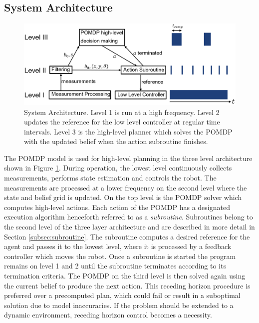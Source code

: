 \subsection{System Architecture}\label{subsec:sysarch}
\begin{figure}
    \centering
    \includegraphics[width=1.0\textwidth]{Report/images/3LevelArchitecture_bothb.png}
    \caption{System Architecture. Level 1 is run at a high frequency. Level 2 updates the reference for the low level controller at regular time intervals. Level 3 is the high-level planner which solves the POMDP with the updated belief when the action subroutine finishes. }
    \label{fig:3levelsarchitecture}
\end{figure}
%
The POMDP model is used for high-level planning in the three level architecture shown in Figure \ref{fig:3levelsarchitecture}. During operation, the lowest level continuously collects measurements, performs state estimation and controls the robot. The measurements are processed at a lower frequency on the second level where the state and belief grid is updated. On the top level is the POMDP solver which computes high-level actions. Each action of the POMDP has a designated execution algorithm henceforth referred to as a \emph{subroutine}. Subroutines belong to the second level of the three layer architecture and are described in more detail in Section \ref{subsec:subroutine}. The subroutine computes a desired reference for the agent and passes it to the lowest level, where it is processed by a feedback controller which moves the robot. Once a subroutine is started the program remains on level 1 and 2 until the subroutine terminates according to its termination criteria. The POMDP on the third level is then solved again using the current belief to produce the next action. This receding horizon procedure is preferred over a precomputed plan, which could fail or result in a suboptimal solution due to model inaccuracies. If the problem should be extended to a dynamic environment, receding horizon control becomes a necessity.\\

